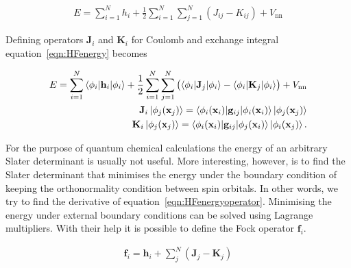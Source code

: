 \begin{align}
    E=\sum_{i=1}^Nh_i + \frac{1}{2}\sum_{i=1}^N\sum_{j=1}^N(J_{ij}-K_{ij})+V_\text{nn}\label{eqn:HFenergy}
\end{align}

Defining operators $\mathbf{J}_i$ and $\mathbf{K}_i$ for Coulomb and exchange
integral equation~\eqref{eqn:HFenergy} becomes

\begin{align}
    \begin{aligned}
    E=\sum_{i=1}^N\braket{\phi_i|\mathbf{h}_i|\phi_i} + \frac{1}{2}\sum_{i=1}^N\sum_{j=1}^N \left( \braket{\phi_i|\mathbf{J}_j|\phi_i} - \braket{\phi_i|\mathbf{K}_j|\phi_i} \right) + V_\text{nn}\\
    \mathbf{J}_i\ket{\phi_j(\mathbf{x}_j)}=\braket{\phi_i(\mathbf{x}_i)|\mathbf{g}_{ij}|\phi_i(\mathbf{x}_i)}\ket{\phi_j(\mathbf{x}_j)}\\
        \mathbf{K}_i\ket{\phi_j(\mathbf{x}_j)}=\braket{\phi_i(\mathbf{x}_i)|\mathbf{g}_{ij}|\phi_j(\mathbf{x}_i)}\ket{\phi_i(\mathbf{x}_j)}.
    \end{aligned}\label{eqn:HFenergyoperator}
\end{align}

For the purpose of quantum chemical calculations the energy of an arbitrary
Slater determinant is usually not useful. More interesting, however, is to find
the Slater determinant that minimises the energy under the boundary condition
of keeping the orthonormality condition between spin orbitals. In other words,
we try to find the derivative of equation~\eqref{eqn:HFenergyoperator}.
Minimising the energy under external boundary conditions can be solved using
Lagrange multipliers. With their help it is possible to define the Fock
operator $\mathbf{f}_i$.

\begin{align}
    \mathbf{f}_i=\mathbf{h}_i + \sum_j^N\left( \mathbf{J}_j - \mathbf{K}_j \right)
\end{align}

